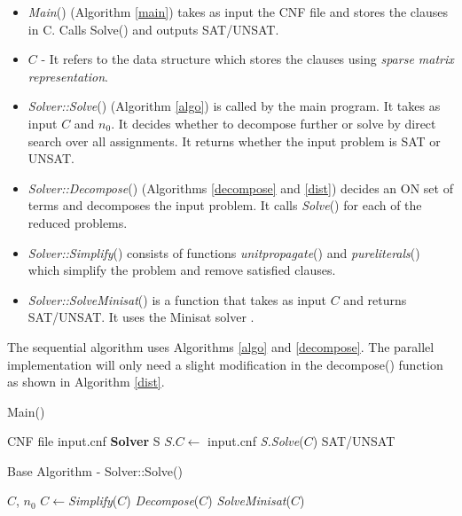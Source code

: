 \begin{itemize}

\item \textit{Main}() (Algorithm \ref{main}) takes as input the CNF file and stores the clauses in C. Calls Solve() and outputs SAT/UNSAT.

\item $C$ - It refers to the data structure which stores the clauses using \textit{sparse matrix representation}.

\item \textit{Solver::Solve}() (Algorithm \ref{algo}) is called by the main program. It takes as input $C$ and $n_0$. It decides whether to decompose further or solve by direct search over all assignments. It returns whether the input problem is SAT or UNSAT.

\item \textit{Solver::Decompose}() (Algorithms \ref{decompose} and \ref{dist}) decides an ON set of terms and decomposes the input problem. It calls \textit{Solve}() for each of the reduced problems.

\item \textit{Solver::Simplify}() consists of functions \textit{unitpropagate}() and \textit{pureliterals}() which simplify the problem and remove satisfied clauses.

\item \textit{Solver::SolveMinisat}() is a function that takes as input $C$ and returns SAT/UNSAT. It uses the Minisat solver \cite{minisat}.
\end{itemize}

The sequential algorithm uses Algorithms \ref{algo} and \ref{decompose}. The parallel implementation will only need a slight modification in the decompose() function as shown in Algorithm \ref{dist}.

\begin{algorithm}
\caption{Main()}
\label{main}
\begin{algorithmic}
\Require CNF file input.cnf
\State \textbf{Solver} S
\State $S.C\gets $ input.cnf
\State \Return \textit{S.Solve}($C$)
\Ensure SAT/UNSAT
\end{algorithmic}
\end{algorithm}

\begin{algorithm}
\caption{Base Algorithm - Solver::Solve()}
\label{algo}
\begin{algorithmic}
\Require $C$, $n_0$
\State $C\gets $\textit{Simplify}($C$)
    \State \textit{Decompose}($C$)
\Else
    \State \Return \textit{SolveMinisat}($C$)
\EndIf
\end{algorithmic}
\end{algorithm}

